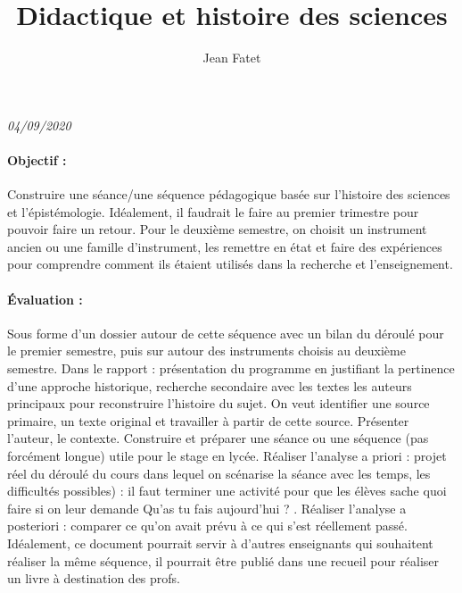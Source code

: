 \documentclass[12pt,a4paper]{article}
\author{Jean Fatet}
\title{Didactique et histoire des sciences}
\date{}
\begin{document}
\maketitle

\emph{04/09/2020}

\paragraph{Objectif :}
Construire une séance/une séquence pédagogique basée sur l'histoire des sciences et l'épistémologie.
Idéalement, il faudrait le faire au premier trimestre pour pouvoir faire un retour.
Pour le deuxième semestre, on choisit un instrument ancien ou une famille d'instrument, les remettre en état et faire des expériences pour comprendre comment ils étaient utilisés dans la recherche et l'enseignement.

\paragraph{Évaluation :}
Sous forme d'un dossier autour de cette séquence avec un bilan du déroulé pour le premier semestre, puis sur autour des instruments choisis au deuxième semestre.
Dans le rapport : présentation du programme en justifiant la pertinence d'une approche historique, recherche secondaire avec les textes les auteurs principaux pour reconstruire l'histoire du sujet.
On veut identifier une source primaire, un texte original et travailler à partir de cette source.
Présenter l'auteur, le contexte.
Construire et préparer une séance ou une séquence (pas forcément longue) utile pour le stage en lycée.
Réaliser l'analyse a priori : projet réel du déroulé du cours dans lequel on scénarise la séance avec les temps, les difficultés possibles) : il faut terminer une activité pour que les élèves sache quoi faire si on leur demande \og Qu'as tu fais aujourd'hui ? \fg{}.
Réaliser l'analyse a posteriori : comparer ce qu'on avait prévu à ce qui s'est réellement passé.
Idéalement, ce document pourrait servir à d'autres enseignants qui souhaitent réaliser la même séquence, il pourrait être publié dans une recueil pour réaliser un livre à destination des profs.
\end{document}
